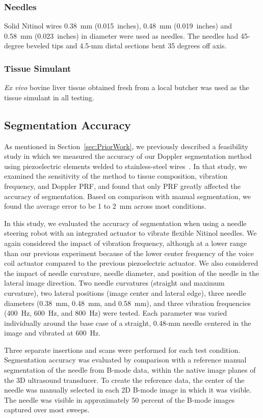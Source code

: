 \subsubsection{Needles}
Solid Nitinol wires 0.38~mm (0.015~inches), 0.48~mm (0.019~inches) and 0.58~mm (0.023~inches) in diameter were used as needles. The needles had 45-degree beveled tips and 4.5-mm distal sections bent 35 degrees off axis.

\subsubsection{Tissue Simulant}
\textit{Ex vivo} bovine liver tissue obtained fresh from a local butcher was used as the tissue simulant in all testing.

\subsection{Segmentation Accuracy}
As mentioned in Section~\ref{sec:PriorWork}, we previously described a feasibility study in which we measured the accuracy of our Doppler segmentation method using piezoelectric elements welded to stainless-steel wires~\cite{Adebar2013}. In that study, we examined the sensitivity of the method to tissue composition, vibration frequency, and Doppler PRF, and found that only PRF greatly affected the accuracy of segmentation. Based on comparison with manual segmentation, we found the average error to be 1 to 2~mm across most conditions.

In this study, we evaluated the accuracy of segmentation when using a needle steering robot with an integrated actuator to vibrate flexible Nitinol needles. We again considered the impact of vibration frequency, although at a lower range than our previous experiment because of the lower center frequency of the voice coil actuator compared to the previous piezoelectric actuator. We also considered the impact of needle curvature, needle diameter, and position of the needle in the lateral image direction. Two needle curvatures (straight and maximum curvature), two lateral positions (image center and lateral edge), three needle diameters (0.38~mm, 0.48~mm, and 0.58~mm), and three vibration frequencies (400~Hz, 600~Hz, and 800~Hz) were tested. Each parameter was varied individually around the base case of a straight, 0.48-mm needle centered in the image and vibrated at 600~Hz. 

Three separate insertions and scans were performed for each test condition. Segmentation accuracy was evaluated by comparison with a reference manual segmentation of the needle from B-mode data, within the native image planes of the 3D ultrasound transducer. To create the reference data, the center of the needle was manually selected in each 2D B-mode image in which it was visible. The needle was visible in approximately 50 percent of the B-mode images captured over most sweeps. 

